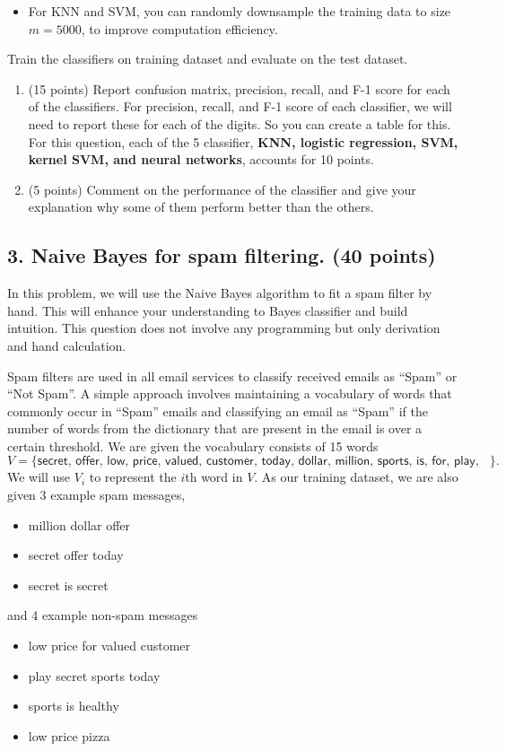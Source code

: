\documentclass[twoside,10pt]{article}
\begin{document}
\begin{enumerate}
\begin{itemize}
\item For KNN and SVM, you can randomly downsample the training data to size $m=5000$, to improve computation efficiency. 
\end{itemize}

Train the classifiers on training dataset and evaluate on the test dataset.

\begin{enumerate}

	\item (15 points) Report confusion matrix, precision, recall, and F-1 score for each of the classifiers. For precision, recall, and F-1 score of each classifier, we will  need to report these for each of the digits. So you can create a table for this. For this question, each of the 5 classifier, {\bf KNN, logistic regression, SVM, kernel SVM, and  neural networks}, accounts for 10 points.
	\item (5 points) Comment on the performance of the classifier and give your explanation why some of them perform better than the others.	
\end{enumerate}



\end{enumerate}


\subsection*{\bf 3. Naive Bayes for spam filtering. (40 points)} 

In this problem, we will use the Naive Bayes algorithm to fit a spam filter by hand. This will enhance your understanding to Bayes classifier and build intuition. This question does not involve any programming but only derivation and hand calculation. 

Spam filters are used in all email services to classify received emails as ``Spam'' or ``Not Spam''. A simple approach involves maintaining a vocabulary of words that commonly occur in ``Spam'' emails and classifying an email as ``Spam'' if the number of words from the dictionary that are present in the email is over a certain threshold.
We are given the vocabulary consists of 15 words \[V=\{\textsf{secret, offer, low, price, valued, customer, today, dollar, million, sports, is, for, play, healthy, pizza}\}.\] We will use $V_i$ to represent the $i$th word in $V$. As our training dataset, we are also given 3 example spam messages,
\begin{itemize}
\item \textsf{million dollar offer}
\item \textsf{secret offer today}
\item \textsf{secret is secret}
\end{itemize}
and 4 example non-spam messages
\begin{itemize}
\item \textsf{low price for valued customer}
\item \textsf{play secret sports today}
\item \textsf{sports is healthy}
\item \textsf{low price pizza}
\end{itemize}
\end{document}
